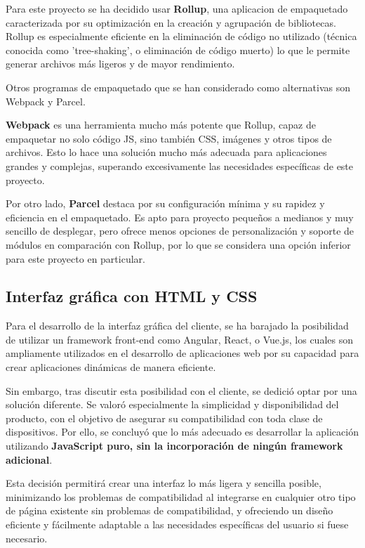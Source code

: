 Para este proyecto se ha decidido usar \textbf{Rollup}, una aplicacion de empaquetado caracterizada por su optimización en la creación y agrupación de bibliotecas. Rollup es especialmente eficiente en la eliminación de código no utilizado (técnica conocida como 'tree-shaking', o eliminación de código muerto) lo que le permite generar archivos más ligeros y de mayor rendimiento.
 
Otros programas de empaquetado que se han considerado como alternativas son Webpack y Parcel. 

\textbf{Webpack} es una herramienta mucho más potente que Rollup, capaz de empaquetar no solo código JS, sino también CSS, imágenes y otros tipos de archivos. Esto lo hace una solución mucho más adecuada para aplicaciones grandes y complejas, superando excesivamente las necesidades específicas de este proyecto.

Por otro lado, \textbf{Parcel} destaca por su configuración mínima y su rapidez y eficiencia en el empaquetado. Es apto para proyecto pequeños a medianos y muy sencillo de desplegar, pero ofrece menos opciones de personalización y soporte de módulos en comparación con Rollup, por lo que se considera una opción inferior para este proyecto en particular.
 
\subsection{Interfaz gráfica con HTML y CSS}

Para el desarrollo de la interfaz gráfica del cliente, se ha barajado la posibilidad de utilizar un framework front-end como Angular\cite{angular}, React\cite{react}, o Vue.js\cite{vue}, los cuales son ampliamente utilizados en el desarrollo de aplicaciones web por su capacidad para crear aplicaciones dinámicas de manera eficiente.

Sin embargo, tras discutir esta posibilidad con el cliente, se dedició optar por una solución diferente. Se valoró especialmente la simplicidad y disponibilidad del producto, con el objetivo de asegurar su compatibilidad con toda clase de dispositivos. Por ello, se  concluyó que lo más adecuado es desarrollar la aplicación utilizando \textbf{JavaScript puro, sin la incorporación de ningún framework adicional}. 

Esta decisión permitirá crear una interfaz lo más ligera y sencilla posible, minimizando los problemas de compatibilidad al integrarse en cualquier otro tipo de página existente sin problemas de compatibilidad, y ofreciendo un diseño eficiente y fácilmente adaptable a las necesidades específicas del usuario si fuese necesario.

